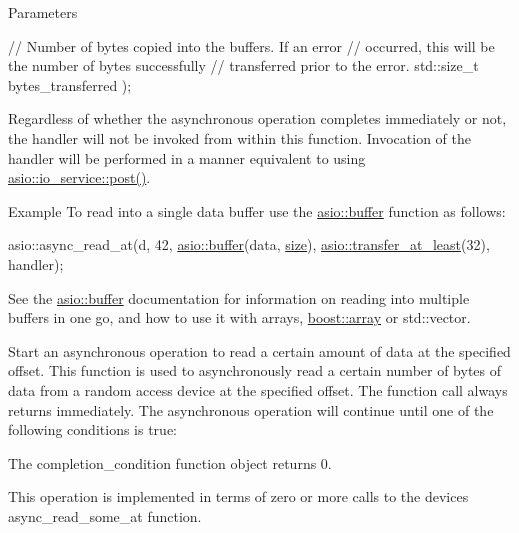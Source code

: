 \begin{DoxyParams}{Parameters}
\begin{DoxyCode}
  \textcolor{comment}{// Number of bytes copied into the buffers. If an error}
  \textcolor{comment}{// occurred, this will be the number of bytes successfully}
  \textcolor{comment}{// transferred prior to the error.}
  std::size\_t bytes\_transferred
); 
\end{DoxyCode}
 Regardless of whether the asynchronous operation completes immediately or not, the handler will not be invoked from within this function. Invocation of the handler will be performed in a manner equivalent to using \hyperlink{classasio_1_1io__service_ae01f809800017295e39786f5bca6652e}{asio\+::io\+\_\+service\+::post()}.\\
\hline
\end{DoxyParams}
\begin{DoxyParagraph}{Example}
To read into a single data buffer use the \hyperlink{group__buffer}{asio\+::buffer} function as follows\+: 
\begin{DoxyCode}
asio::async\_read\_at(d, 42,
   \hyperlink{group__buffer_ga1ed66e401559cbfd19595392f653b47c}{asio::buffer}(data, \hyperlink{namespaceuva_1_1utils_1_1containers_aea6a0a858974dd7edb4227dcbcbc1eb6a0be5bdf7cf8c7c58d0bc5678caa07791}{size}),
   \hyperlink{group__completion__condition_ga2b10af704afcd6c7ed7f0d3b740033ef}{asio::transfer\_at\_least}(32),
   handler); 
\end{DoxyCode}
 See the \hyperlink{group__buffer}{asio\+::buffer} documentation for information on reading into multiple buffers in one go, and how to use it with arrays, \hyperlink{classboost_1_1array}{boost\+::array} or std\+::vector.
\end{DoxyParagraph}
Start an asynchronous operation to read a certain amount of data at the specified offset. This function is used to asynchronously read a certain number of bytes of data from a random access device at the specified offset. The function call always returns immediately. The asynchronous operation will continue until one of the following conditions is true\+:

\begin{DoxyItemize}
\item The completion\+\_\+condition function object returns 0.\end{DoxyItemize}
This operation is implemented in terms of zero or more calls to the device\textquotesingle{}s async\+\_\+read\+\_\+some\+\_\+at function.



